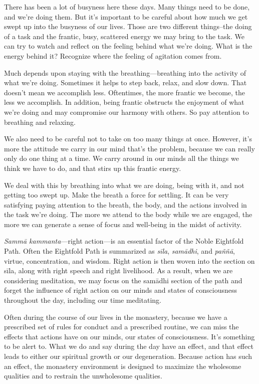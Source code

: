 
There has been a lot of busyness here these days. Many things need to 
be done, and we're doing them. But it's important to be careful about 
how much we get swept up into the busyness of our lives. Those are two 
different things–the doing of a task and the frantic, busy, scattered 
energy we may bring to the task. We can try to watch and reflect on the 
feeling behind what we're doing. What is the energy behind it? 
Recognize where the feeling of agitation comes from.

Much depends upon staying with the breathing---breathing into the 
activity of what we're doing. Sometimes it helps to step back, relax, 
and slow down. That doesn't mean we accomplish less. Oftentimes, the 
more frantic we become, the less we accomplish. In addition, being 
frantic obstructs the enjoyment of what we're doing and may compromise 
our harmony with others. So pay attention to breathing and relaxing.

We also need to be careful not to take on too many things at once. 
However, it's more the attitude we carry in our mind that's the 
problem, because we can really only do one thing at a time. We carry 
around in our minds all the things we think we have to do, and that 
stirs up this frantic energy.

We deal with this by breathing into what we are doing, being with it, 
and not getting too swept up. Make the breath a force for settling. It 
can be very satisfying paying attention to the breath, the body, and 
the actions involved in the task we're doing. The more we attend to the 
body while we are engaged, the more we can generate a sense of focus 
and well-being in the midst of activity.


\emph{Sammā kammanta}---right action---is an essential factor of the 
Noble Eightfold Path. Often the Eightfold Path is summarized as 
\emph{sīla}, \emph{samādhi}, and \emph{paññā}, virtue, 
concentration, and wisdom. Right action is then woven into the section 
on sīla, along with right speech and right livelihood. As a result, 
when we are considering meditation, we may focus on the samādhi 
section of the path and forget the influence of right action on our 
minds and states of consciousness throughout the day, including our 
time meditating.

Often during the course of our lives in the monastery, because we have 
a prescribed set of rules for conduct and a prescribed routine, we can 
miss the effects that actions have on our minds, our states of 
consciousness. It's something to be alert to. What we do and say during 
the day have an effect, and that effect leads to either our spiritual 
growth or our degeneration. Because action has such an effect, the 
monastery environment is designed to maximize the wholesome qualities 
and to restrain the unwholesome qualities.

